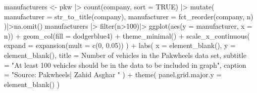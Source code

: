 \documentclass[
  letterpaper,
  DIV=11,
  numbers=noendperiod]{scrartcl}
\newenvironment{Shaded}{\begin{snugshade}}{\end{snugshade}}
\newcommand{\AttributeTok}[1]{\textcolor[rgb]{0.40,0.45,0.13}{#1}}
\newcommand{\ConstantTok}[1]{\textcolor[rgb]{0.56,0.35,0.01}{#1}}
\newcommand{\DecValTok}[1]{\textcolor[rgb]{0.68,0.00,0.00}{#1}}
\newcommand{\FloatTok}[1]{\textcolor[rgb]{0.68,0.00,0.00}{#1}}
\newcommand{\FunctionTok}[1]{\textcolor[rgb]{0.28,0.35,0.67}{#1}}
\newcommand{\NormalTok}[1]{\textcolor[rgb]{0.00,0.23,0.31}{#1}}
\newcommand{\OtherTok}[1]{\textcolor[rgb]{0.00,0.23,0.31}{#1}}
\newcommand{\SpecialCharTok}[1]{\textcolor[rgb]{0.37,0.37,0.37}{#1}}
\newcommand{\StringTok}[1]{\textcolor[rgb]{0.13,0.47,0.30}{#1}}
\begin{document}
\begin{Shaded}
\begin{Highlighting}[]
\NormalTok{manufacturers }\OtherTok{\textless{}{-}}\NormalTok{ pkw }\SpecialCharTok{|\textgreater{}} 
  \FunctionTok{count}\NormalTok{(company, }\AttributeTok{sort =} \ConstantTok{TRUE}\NormalTok{) }\SpecialCharTok{|\textgreater{}} 
  \FunctionTok{mutate}\NormalTok{(}
    \AttributeTok{manufacturer =} \FunctionTok{str\_to\_title}\NormalTok{(company),}
    \AttributeTok{manufacturer =} \FunctionTok{fct\_reorder}\NormalTok{(company, n) }
\NormalTok{  )}\SpecialCharTok{|\textgreater{}}\FunctionTok{na.omit}\NormalTok{()}
\NormalTok{manufacturers }\SpecialCharTok{|\textgreater{}} \FunctionTok{filter}\NormalTok{(n}\SpecialCharTok{\textgreater{}}\DecValTok{100}\NormalTok{)}\SpecialCharTok{|\textgreater{}}
  \FunctionTok{ggplot}\NormalTok{(}\FunctionTok{aes}\NormalTok{(}\AttributeTok{y =}\NormalTok{ manufacturer, }\AttributeTok{x =}\NormalTok{ n)) }\SpecialCharTok{+}
  \FunctionTok{geom\_col}\NormalTok{(}\AttributeTok{fill =} \StringTok{\textquotesingle{}dodgerblue4\textquotesingle{}}\NormalTok{) }\SpecialCharTok{+}
  \FunctionTok{theme\_minimal}\NormalTok{() }\SpecialCharTok{+}
  \FunctionTok{scale\_x\_continuous}\NormalTok{(}
    \AttributeTok{expand =} \FunctionTok{expansion}\NormalTok{(}\AttributeTok{mult =} \FunctionTok{c}\NormalTok{(}\DecValTok{0}\NormalTok{, }\FloatTok{0.05}\NormalTok{))}
\NormalTok{  ) }\SpecialCharTok{+}
  \FunctionTok{labs}\NormalTok{(}
    \AttributeTok{x =} \FunctionTok{element\_blank}\NormalTok{(), }
    \AttributeTok{y =} \FunctionTok{element\_blank}\NormalTok{(),}
    \AttributeTok{title =} \StringTok{\textquotesingle{}Number of vehicles in the Pakwheels data set\textquotesingle{}}\NormalTok{,}
    \AttributeTok{subtitle =} \StringTok{"At least 100 vehicles should be in the data to be included in graph"}\NormalTok{,}
    \AttributeTok{caption =} \StringTok{"Source: Pakwheels| Zahid Asghar "}
\NormalTok{  ) }\SpecialCharTok{+}
  \FunctionTok{theme}\NormalTok{(}
    \AttributeTok{panel.grid.major.y =} \FunctionTok{element\_blank}\NormalTok{()}
\NormalTok{  )}
\end{Highlighting}
\end{Shaded}
\end{document}
